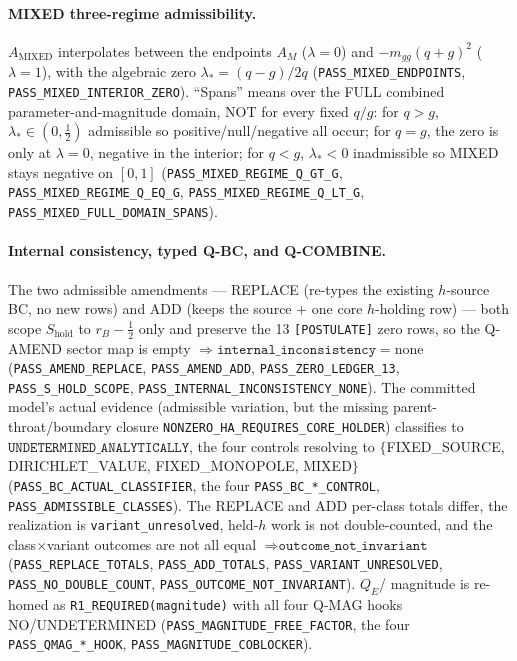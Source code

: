\paragraph{MIXED three-regime admissibility.}
\(A_{\mathrm{MIXED}}\) interpolates between the endpoints \(A_M\) (\(\lambda=0\))
and \(-m_{gg}(q+g)^2\) (\(\lambda=1\)), with the algebraic zero
\(\lambda_*=(q-g)/2q\) (\texttt{PASS\_MIXED\_ENDPOINTS},
\texttt{PASS\_MIXED\_INTERIOR\_ZERO}). ``Spans'' means over the FULL combined
parameter-and-magnitude domain, NOT for every fixed \(q/g\): for \(q>g\),
\(\lambda_*\in(0,\tfrac12)\) admissible so positive/null/negative all occur; for
\(q=g\), the zero is only at \(\lambda=0\), negative in the interior; for \(q<g\),
\(\lambda_*<0\) inadmissible so MIXED stays negative on \([0,1]\)
(\texttt{PASS\_MIXED\_REGIME\_Q\_GT\_G}, \texttt{PASS\_MIXED\_REGIME\_Q\_EQ\_G},
\texttt{PASS\_MIXED\_REGIME\_Q\_LT\_G}, \texttt{PASS\_MIXED\_FULL\_DOMAIN\_SPANS}).

\paragraph{Internal consistency, typed Q-BC, and Q-COMBINE.}
The two admissible amendments --- REPLACE (re-types the existing \(h\)-source BC,
no new rows) and ADD (keeps the source + one core \(h\)-holding row) --- both scope
\(S_{\mathrm{hold}}\) to \(r_B-\tfrac12\) only and preserve the 13
\texttt{[POSTULATE]} zero rows, so the Q-AMEND sector map is empty
\(\Rightarrow\texttt{internal\_inconsistency}=\)none
(\texttt{PASS\_AMEND\_REPLACE}, \texttt{PASS\_AMEND\_ADD},
\texttt{PASS\_ZERO\_LEDGER\_13}, \texttt{PASS\_S\_HOLD\_SCOPE},
\texttt{PASS\_INTERNAL\_INCONSISTENCY\_NONE}). The committed model's actual evidence
(admissible variation, but the missing parent-throat/boundary closure
\texttt{NONZERO\_HA\_REQUIRES\_CORE\_HOLDER}) classifies to
\(\texttt{UNDETERMINED\_ANALYTICALLY}\), the four controls resolving to
\(\{\)FIXED\_SOURCE, DIRICHLET\_VALUE, FIXED\_MONOPOLE, MIXED\(\}\)
(\texttt{PASS\_BC\_ACTUAL\_CLASSIFIER}, the four \texttt{PASS\_BC\_*\_CONTROL},
\texttt{PASS\_ADMISSIBLE\_CLASSES}). The REPLACE and ADD per-class totals differ, the
realization is \texttt{variant\_unresolved}, held-\(h\) work is not double-counted,
and the class\(\times\)variant outcomes are not all equal \(\Rightarrow
\texttt{outcome\_not\_invariant}\) (\texttt{PASS\_REPLACE\_TOTALS},
\texttt{PASS\_ADD\_TOTALS}, \texttt{PASS\_VARIANT\_UNRESOLVED},
\texttt{PASS\_NO\_DOUBLE\_COUNT}, \texttt{PASS\_OUTCOME\_NOT\_INVARIANT}). \(Q_E\)/
magnitude is re-homed as \texttt{R1\_REQUIRED(magnitude)} with all four Q-MAG hooks
NO/UNDETERMINED (\texttt{PASS\_MAGNITUDE\_FREE\_FACTOR}, the four
\texttt{PASS\_QMAG\_*\_HOOK}, \texttt{PASS\_MAGNITUDE\_COBLOCKER}).

